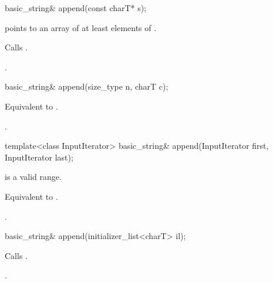 %
%
\begin{itemdecl}
basic_string& append(const charT* s);
\end{itemdecl}

\begin{itemdescr}
\pnum
\requires {} points to an array of at least 
elements of .

\pnum
\effects Calls .

\pnum
\returns
{}.
\end{itemdescr}

%
%
\begin{itemdecl}
basic_string& append(size_type n, charT c);
\end{itemdecl}

\begin{itemdescr}
\pnum
\effects Equivalent to .

\pnum
\returns
{}.
\end{itemdescr}

%
%
\begin{itemdecl}
template<class InputIterator>
  basic_string& append(InputIterator first, InputIterator last);
\end{itemdecl}

\begin{itemdescr}
\pnum
\requires {} is a valid range.

\pnum
\effects Equivalent to .

\pnum
\returns
{}.
\end{itemdescr}

%
%
\begin{itemdecl}
basic_string& append(initializer_list<charT> il);
\end{itemdecl}

\begin{itemdescr}
\pnum
\effects Calls .

\pnum
\returns
{}.
\end{itemdescr}

